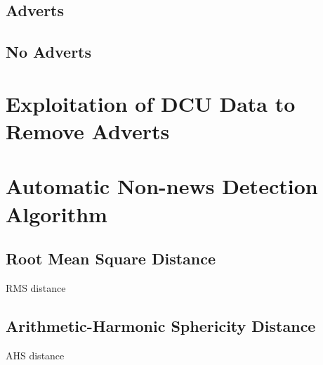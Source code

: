 \subsection{Adverts}

\subsection{No Adverts}

\section{Exploitation of DCU Data to Remove Adverts}

\section{Automatic Non-news Detection Algorithm}

\subsection{Root Mean Square Distance}
RMS distance
\subsection{Arithmetic-Harmonic Sphericity Distance}
AHS distance
